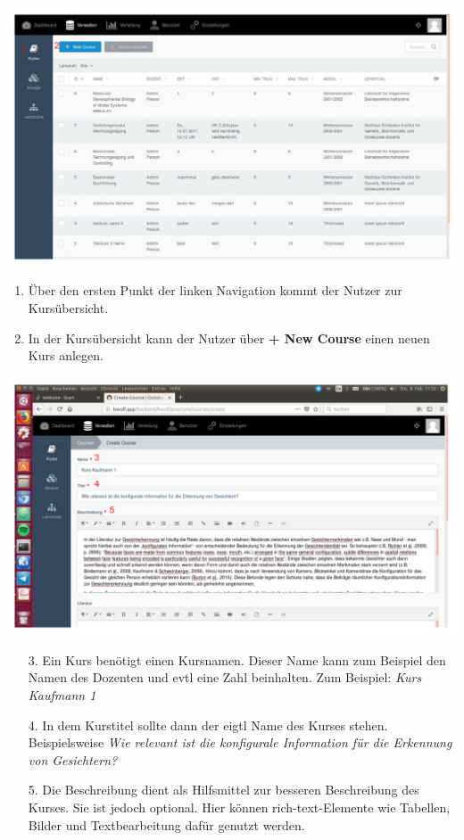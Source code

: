     \includegraphics[scale=0.3]{backend/img/verwalten_kurse.pdf}
    \begin{enumerate}
     \item Über den ersten Punkt der linken Navigation kommt der Nutzer zur Kursübersicht.
     \item In der Kursübersicht kann der Nutzer über \textbf{+ New Course} einen neuen Kurs anlegen. 
    \end{enumerate}
    \includegraphics[scale=0.3]{backend/img/create_course_1.pdf}
    \begin{enumerate}
     \item[3.] Ein Kurs benötigt einen Kursnamen. Dieser Name kann zum Beispiel den Namen des Dozenten und evtl eine Zahl beinhalten. Zum Beispiel: \textit{Kurs Kaufmann 1}
     \item[4.] In dem Kurstitel sollte dann der eigtl Name des Kurses stehen. Beispielsweise \textit{Wie relevant ist die konfigurale Information für die Erkennung von Gesichtern?}
     \item[5.] Die Beschreibung dient als Hilfsmittel zur besseren Beschreibung des Kurses. Sie ist jedoch optional.
	       Hier können rich-text-Elemente wie Tabellen, Bilder und Textbearbeitung dafür genutzt werden.
    \end{enumerate}

